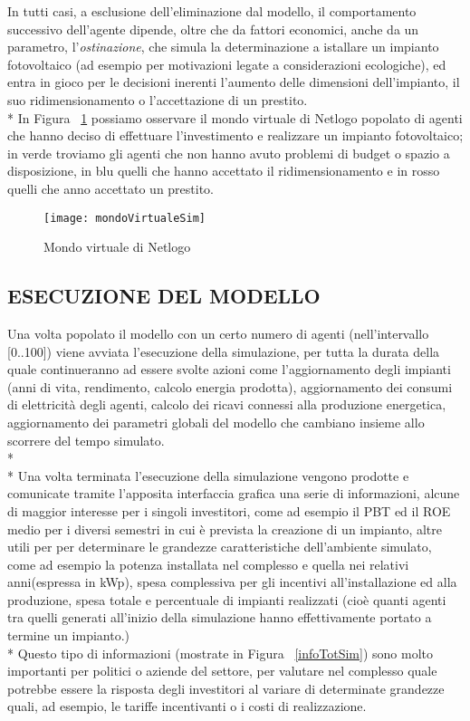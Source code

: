 \documentclass[12pt,a4paper,openright,twoside]{report}
\begin{document}
In tutti casi, a esclusione dell'eliminazione dal modello, il comportamento successivo dell'agente dipende, oltre che da fattori economici, anche da un parametro, l'\emph{ostinazione}, che simula la determinazione a istallare un impianto fotovoltaico (ad esempio per motivazioni legate a considerazioni ecologiche), ed entra in gioco per le decisioni inerenti l'aumento delle dimensioni dell'impianto, il suo ridimensionamento o l'accettazione di un prestito.\\*
In Figura ~\ref{mondoVirtualeSim} possiamo osservare il mondo virtuale di Netlogo popolato di agenti che hanno deciso di effettuare l'investimento e realizzare un impianto fotovoltaico; in verde troviamo gli agenti che non hanno avuto problemi di budget o spazio a disposizione, in blu quelli che hanno accettato il ridimensionamento e in rosso quelli che anno accettato un prestito.

\begin{figure}[hbt]
	\centering
	\texttt{[image: mondoVirtualeSim]}
	\caption{Mondo virtuale di Netlogo}
	\label{mondoVirtualeSim}
\end{figure}

\subsection{ESECUZIONE DEL MODELLO}

Una volta popolato il modello con un certo numero di agenti (nell'intervallo [0..100]) viene avviata l'esecuzione della simulazione, per tutta la durata della quale continueranno ad essere svolte azioni come l'aggiornamento degli impianti (anni di vita, rendimento, calcolo energia prodotta), aggiornamento dei consumi di elettricità degli agenti, calcolo dei ricavi connessi alla produzione energetica, aggiornamento dei parametri globali del modello che cambiano insieme allo scorrere del tempo simulato. 
\\* \\*
Una volta terminata l'esecuzione della simulazione vengono prodotte e comunicate tramite l'apposita interfaccia grafica una serie di informazioni, alcune di maggior interesse per i singoli investitori, come ad esempio il PBT ed il ROE medio per i diversi semestri in cui è prevista la creazione di un impianto, altre utili per  per determinare le grandezze caratteristiche dell'ambiente simulato, come ad esempio la potenza installata nel complesso e quella nei relativi anni(espressa in kWp), spesa complessiva per gli incentivi all'installazione ed alla produzione, spesa totale e percentuale di impianti realizzati (cioè quanti agenti tra quelli generati all'inizio della simulazione hanno effettivamente portato a termine un impianto.)
\\*
Questo tipo di informazioni (mostrate in Figura ~\ref{infoTotSim}) sono molto importanti per politici o aziende del settore, per valutare nel complesso quale potrebbe essere la risposta degli investitori al variare di determinate grandezze quali, ad esempio, le tariffe incentivanti o i costi di realizzazione. 
\end{document}
